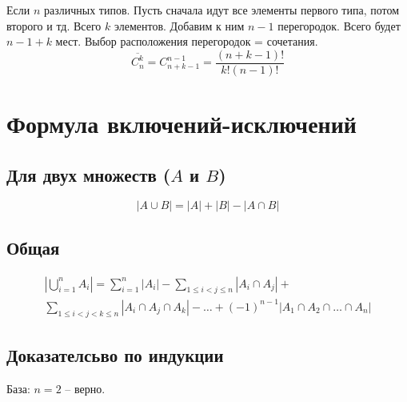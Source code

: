 \documentclass[main]{subfiles}
\begin{document}
Если $n$ различных типов. Пусть сначала идут все элементы первого типа, потом
второго и тд. Всего $k$ элементов. Добавим к ним $n-1$ перегородок. Всего будет
$n - 1 + k$ мест. Выбор расположения перегородок = сочетания.
\[
    \overline{C_n^k} = C_{n + k - 1}^{n - 1} = \frac{(n + k - 1)!}{k!(n - 1)!}
\]

\section{Формула включений-исключений}
\subsection{Для двух множеств ($A$ и $B$)}
\[
    |A \cup B| = |A| + |B| - |A \cap B|    
\]

\subsection{Общая}
\begin{multline*}
    \left|\bigcup_{i = 1}^n A_i\right| = 
    \sum_{i = 1}^{n} |A_i| - 
    \sum_{1 \leq i < j \leq n} |A_i \cap A_j| + \\
    \sum_{1 \leq i < j < k \leq n} |A_i \cap A_j \cap A_k| -
    \ldots + 
    (-1)^{n-1} |A_1 \cap A_2 \cap \ldots \cap A_n|
\end{multline*}

\subsection{Доказателсьво по индукции}
База: $n = 2$ -- верно.
\end{document}
